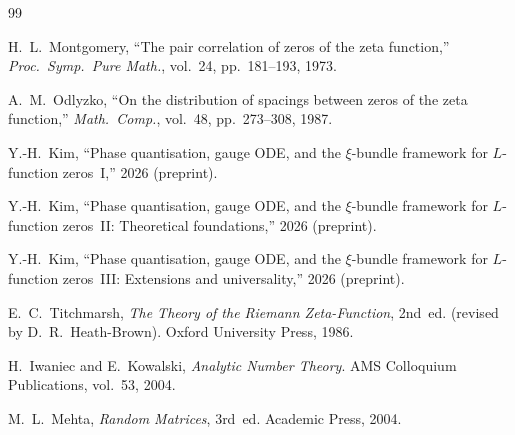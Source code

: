 \documentclass[11pt,a4paper]{article}
\theoremstyle{plain}
\theoremstyle{definition}
\begin{document}
\begin{thebibliography}{99}

H.~L.~Montgomery,
``The pair correlation of zeros of the zeta function,''
\textit{Proc.\ Symp.\ Pure Math.}, vol.~24, pp.~181--193, 1973.

A.~M.~Odlyzko,
``On the distribution of spacings between zeros of the zeta function,''
\textit{Math.\ Comp.}, vol.~48, pp.~273--308, 1987.

Y.-H.~Kim,
``Phase quantisation, gauge ODE, and the $\xi$-bundle framework
for $L$-function zeros~I,''
2026 (preprint).

Y.-H.~Kim,
``Phase quantisation, gauge ODE, and the $\xi$-bundle framework
for $L$-function zeros~II: Theoretical foundations,''
2026 (preprint).

Y.-H.~Kim,
``Phase quantisation, gauge ODE, and the $\xi$-bundle framework
for $L$-function zeros~III: Extensions and universality,''
2026 (preprint).

E.~C.~Titchmarsh,
\textit{The Theory of the Riemann Zeta-Function}, 2nd~ed.
(revised by D.~R.~Heath-Brown). Oxford University Press, 1986.

H.~Iwaniec and E.~Kowalski,
\textit{Analytic Number Theory}.
AMS Colloquium Publications, vol.~53, 2004.

M.~L.~Mehta,
\textit{Random Matrices}, 3rd~ed. Academic Press, 2004.

\end{thebibliography}
\end{document}
